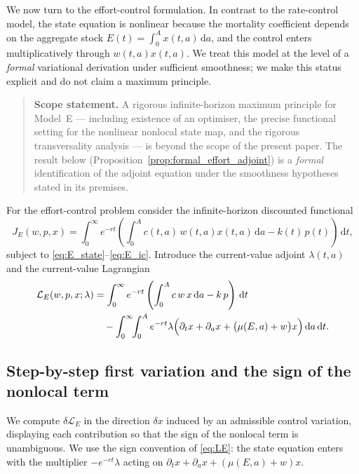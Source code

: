 \documentclass[pdflatex,sn-mathphys-num]{sn-jnl}
\theoremstyle{definition}
\theoremstyle{remark}
\newcommand{\dd}{\,\mathrm{d}}
\begin{document}
We now turn to the effort-control formulation. In contrast to the
rate-control model, the state equation is nonlinear because the mortality
coefficient depends on the aggregate stock $E(t)=\int_0^A x(t,a)\dd a$, and
the control enters multiplicatively through $w(t,a)x(t,a)$. 
We treat this model at the level of a \emph{formal} variational derivation under sufficient smoothness; we make this status explicit and do not claim a maximum principle.

\begin{quote}
\textbf{Scope statement.} A rigorous infinite-horizon maximum principle for
Model~E --- including existence of an optimiser, the precise functional
setting for the nonlinear nonlocal state map, and the rigorous transversality
analysis --- is beyond the scope of the present paper. The result below
(Proposition~\ref{prop:formal_effort_adjoint}) is a \emph{formal}
identification of the adjoint equation under the smoothness hypotheses stated
in its premises.
\end{quote}

For the effort-control problem consider the infinite-horizon discounted
functional
\begin{equation}\label{eq:PE_obj}
J_E(w,p,x)=\int_0^\infty e^{-rt}
\left(\int_0^A c(t,a)\,w(t,a)x(t,a)\dd a-k(t)\,p(t)\right)\dd t,
\end{equation}
subject to \eqref{eq:E_state}--\eqref{eq:E_ic}. Introduce the current-value
adjoint $\lambda(t,a)$ and the current-value Lagrangian
\begin{align}
\mathcal L_E(w,p,x;\lambda)
&=\int_0^\infty e^{-rt}\left(\int_0^A c\,w\,x\dd a-k\,p\right)\dd t
\notag\\
&\quad-\int_0^\infty\!\!\int_0^A e^{-rt}\lambda
\Bigl(\partial_t x+\partial_a x+\bigl(\mu(E,a)+w\bigr)x\Bigr)\dd a\dd t.
\label{eq:LE}
\end{align}


\subsection{Step-by-step first variation and the sign of the nonlocal term}
\label{subsec:sign_check}

We compute $\delta\mathcal L_E$ in the direction $\delta x$ induced by an
admissible control variation, displaying each contribution so that the sign
of the nonlocal term is unambiguous. We use the sign
convention of \eqref{eq:LE}: the state equation enters with the multiplier
$-e^{-rt}\lambda$ acting on $\partial_t x+\partial_a x+(\mu(E,a)+w)x$.
\end{document}
